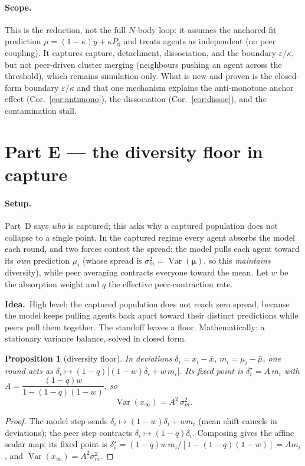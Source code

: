 \documentclass[11pt]{article}
\newtheorem{proposition}{Proposition}
\theoremstyle{definition}
\DeclareMathOperator{\Var}{Var}
\newcommand{\idea}[1]{\par\medskip\noindent\textbf{Idea.}\ #1\par\medskip}
\begin{document}
\paragraph{Scope.} This is the reduction, not the full $N$-body loop: it assumes the
anchored-fit prediction $\mu=(1-\kappa)y+\kappa P_0$ and treats agents as independent (no
peer coupling). It captures capture, detachment, dissociation, and the boundary
$\varepsilon/\kappa$, but not peer-driven cluster merging (neighbours pushing an agent
across the threshold), which remains simulation-only. What is new and proven is the
closed-form boundary $\varepsilon/\kappa$ and that one mechanism explains the
anti-monotone anchor effect (Cor.~\ref{cor:antimono}), the dissociation
(Cor.~\ref{cor:dissoc}), and the contamination stall.

\section{Part E --- the diversity floor in capture}

\paragraph{Setup.} Part~D says \emph{who} is captured; this asks why a captured
population does not collapse to a single point. In the captured regime every agent
absorbs the model each round, and two forces contest the spread: the model pulls each
agent toward its \emph{own} prediction $\mu_i$ (whose spread is $\sigma_m^2=\Var(\bm\mu)$,
so this \emph{maintains} diversity), while peer averaging contracts everyone toward the
mean. Let $w$ be the absorption weight and $q$ the effective peer-contraction rate.

\idea{High level: the captured population does not reach zero spread, because the model
keeps pulling agents back apart toward their distinct predictions while peers pull them
together. The standoff leaves a floor. Mathematically: a stationary variance balance,
solved in closed form.}

\begin{proposition}[diversity floor]\label{prop:floor}
In deviations $\delta_i=x_i-\bar x$, $m_i=\mu_i-\bar\mu$, one round acts as
$\delta_i\mapsto(1-q)\big[(1-w)\delta_i+w\,m_i\big]$. Its fixed point is
$\delta_i^\star=A\,m_i$ with $A=\dfrac{(1-q)w}{1-(1-q)(1-w)}$, so
\[
\Var(x_\infty)=A^2\,\sigma_m^2 .
\]
\end{proposition}
\begin{proof}
The model step sends $\delta_i\mapsto(1-w)\delta_i+w m_i$ (mean shift cancels in
deviations); the peer step contracts $\delta_i\mapsto(1-q)\delta_i$. Composing gives the
affine scalar map; its fixed point is
$\delta_i^\star=(1-q)w\,m_i/[1-(1-q)(1-w)]=A m_i$, and $\Var(x_\infty)=A^2\sigma_m^2$.
\end{proof}
\end{document}

